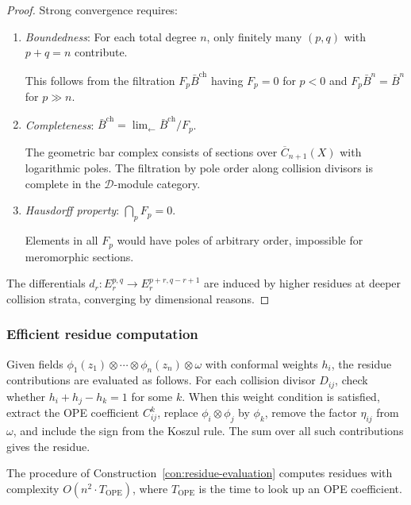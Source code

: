 \begin{proof}
Strong convergence requires:
\begin{enumerate}
\item \emph{Boundedness}: For each total degree $n$, only finitely many $(p,q)$ with $p+q=n$ contribute.

This follows from the filtration $F_p\bar{B}^{\text{ch}}$ having $F_p = 0$ for $p < 0$ and $F_p\bar{B}^n = \bar{B}^n$ for $p \gg n$.

\item \emph{Completeness}: $\bar{B}^{\text{ch}} = \lim_{\leftarrow} \bar{B}^{\text{ch}}/F_p$.

The geometric bar complex consists of sections over $\overline{C}_{n+1}(X)$ with logarithmic poles. The filtration by pole order along collision divisors is complete in the $\mathcal{D}$-module category.

\item \emph{Hausdorff property}: $\bigcap_p F_p = 0$.

Elements in all $F_p$ would have poles of arbitrary order, impossible for meromorphic sections.
\end{enumerate}

The differentials $d_r: E_r^{p,q} \to E_r^{p+r,q-r+1}$ are induced by higher residues at deeper collision strata, converging by dimensional reasons.
\end{proof}

\subsubsection{Efficient residue computation}
 
\begin{construction}\label{con:residue-evaluation}
Given fields $\phi_1(z_1) \otimes \cdots \otimes \phi_n(z_n) \otimes \omega$ with conformal weights $h_i$, the residue contributions are evaluated as follows.
For each collision divisor $D_{ij}$, check whether $h_i + h_j - h_k = 1$ for some $k$.  When this weight condition is satisfied, extract the OPE coefficient $C^k_{ij}$, replace $\phi_i \otimes \phi_j$ by $\phi_k$, remove the factor $\eta_{ij}$ from $\omega$, and include the sign from the Koszul rule.  The sum over all such contributions gives the residue.
\end{construction}

 
\begin{proposition}
\label{prop:residue-evaluation-complexity}
The procedure of Construction~\ref{con:residue-evaluation} computes residues with complexity $O(n^2 \cdot T_{\mathrm{OPE}})$, where $T_{\mathrm{OPE}}$ is the time to look up an OPE coefficient.
\end{proposition}

